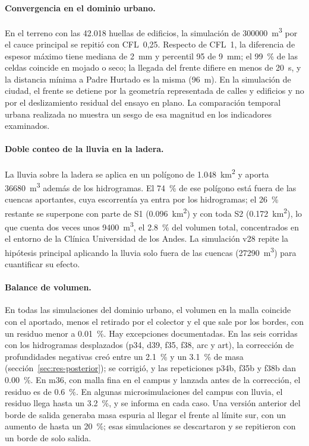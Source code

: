 \paragraph{Convergencia en el dominio urbano.} En el terreno con las 42.018 huellas de edificios, la simulación de \SI{300000}{m^3} por el cauce principal se repitió con CFL~0,25. Respecto de CFL~1, la diferencia de espesor máximo tiene mediana de \SI{2}{mm} y percentil 95 de \SI{9}{mm}; el \SI{99}{\percent} de las celdas coincide en mojado o seco; la llegada del frente difiere en menos de \SI{20}{s}, y la distancia mínima a Padre Hurtado es la misma (\SI{96}{m}). En la simulación de ciudad, el frente se detiene por la geometría representada de calles y edificios y no por el deslizamiento residual del ensayo en plano. La comparación temporal urbana realizada no muestra un sesgo de esa magnitud en los indicadores examinados.
\paragraph{Doble conteo de la lluvia en la ladera.} La lluvia sobre la ladera se aplica en un polígono de \SI{1,048}{km^2} y aporta \SI{36680}{m^3} además de los hidrogramas. El \SI{74}{\percent} de ese polígono está fuera de las cuencas aportantes, cuya escorrentía ya entra por los hidrogramas; el \SI{26}{\percent} restante se superpone con parte de S1 (\SI{0,096}{km^2}) y con toda S2 (\SI{0,172}{km^2}), lo que cuenta dos veces unos \SI{9400}{m^3}, el \SI{2,8}{\percent} del volumen total, concentrados en el entorno de la Clínica Universidad de los Andes. La simulación v28 repite la hipótesis principal aplicando la lluvia solo fuera de las cuencas (\SI{27290}{m^3}) para cuantificar su efecto.
\paragraph{Balance de volumen.} En todas las simulaciones del dominio urbano, el volumen en la malla coincide con el aportado, menos el retirado por el colector y el que sale por los bordes, con un residuo menor a \SI{0,01}{\percent}. Hay excepciones documentadas. En las seis corridas con los hidrogramas desplazados (p34, d39, f35, f38, arc y art), la corrección de profundidades negativas creó entre un \SI{2,1}{\percent} y un \SI{3,1}{\percent} de masa (sección~\ref{sec:res-posterior}); se corrigió, y las repeticiones p34b, f35b y f38b dan \SI{0,00}{\percent}. En m36, con malla fina en el campus y lanzada antes de la corrección, el residuo es de \SI[retain-explicit-plus=true]{+0,6}{\percent}. En algunas microsimulaciones del campus con lluvia, el residuo llega hasta un \SI{3,2}{\percent}, y se informa en cada caso. Una versión anterior del borde de salida generaba masa espuria al llegar el frente al límite sur, con un aumento de hasta un \SI{20}{\percent}; esas simulaciones se descartaron y se repitieron con un borde de solo salida.


